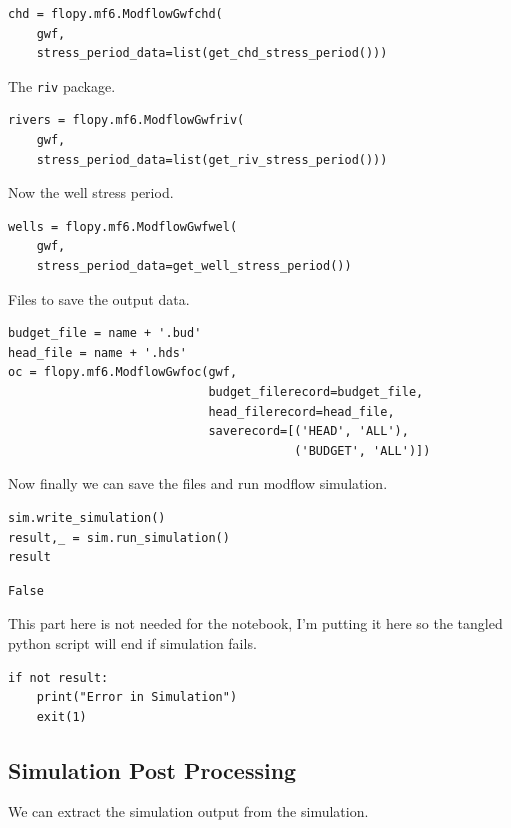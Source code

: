 \documentclass[titlepage,12pt]{unisubmission}
\begin{document}
\begin{verbatim}
chd = flopy.mf6.ModflowGwfchd(
    gwf,
    stress_period_data=list(get_chd_stress_period()))
\end{verbatim}

The \texttt{riv} package.

\begin{verbatim}
rivers = flopy.mf6.ModflowGwfriv(
    gwf,
    stress_period_data=list(get_riv_stress_period()))
\end{verbatim}

Now the well stress period.

\begin{verbatim}
wells = flopy.mf6.ModflowGwfwel(
    gwf,
    stress_period_data=get_well_stress_period())
\end{verbatim}

Files to save the output data.

\begin{verbatim}
budget_file = name + '.bud'
head_file = name + '.hds'
oc = flopy.mf6.ModflowGwfoc(gwf,
                            budget_filerecord=budget_file,
                            head_filerecord=head_file,
                            saverecord=[('HEAD', 'ALL'),
                                        ('BUDGET', 'ALL')])
\end{verbatim}

Now finally we can save the files and run modflow simulation.

\begin{verbatim}
sim.write_simulation()
result,_ = sim.run_simulation()
result
\end{verbatim}

\begin{verbatim}
False
\end{verbatim}

This part here is not needed for the notebook, I'm putting it here so the tangled python script will end if simulation fails.

\begin{verbatim}
if not result:
    print("Error in Simulation")
    exit(1)
\end{verbatim}

\subsection{Simulation Post Processing}
\label{sec:org6869e0f}
We can extract the simulation output from the simulation.
\end{document}
